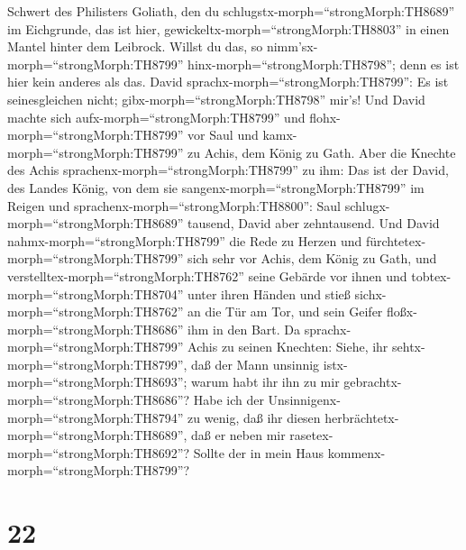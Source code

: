 Schwert des Philisters Goliath, den du
schlugstx-morph=``strongMorph:TH8689'' im Eichgrunde, das ist hier,
gewickeltx-morph=``strongMorph:TH8803'' in einen Mantel hinter dem
Leibrock. Willst du das, so nimm'sx-morph=``strongMorph:TH8799''
hinx-morph=``strongMorph:TH8798''; denn es ist hier kein anderes als
das. David sprachx-morph=``strongMorph:TH8799'': Es ist seinesgleichen
nicht; gibx-morph=``strongMorph:TH8798'' mir's!  Und David
machte sich aufx-morph=``strongMorph:TH8799'' und
flohx-morph=``strongMorph:TH8799'' vor Saul und
kamx-morph=``strongMorph:TH8799'' zu Achis, dem König zu Gath.
 Aber die Knechte des Achis
sprachenx-morph=``strongMorph:TH8799'' zu ihm: Das ist der David, des
Landes König, von dem sie sangenx-morph=``strongMorph:TH8799'' im Reigen
und sprachenx-morph=``strongMorph:TH8800'': Saul
schlugx-morph=``strongMorph:TH8689'' tausend, David aber zehntausend.
 Und David nahmx-morph=``strongMorph:TH8799'' die Rede zu
Herzen und fürchtetex-morph=``strongMorph:TH8799'' sich sehr vor Achis,
dem König zu Gath,  und
verstelltex-morph=``strongMorph:TH8762'' seine Gebärde vor ihnen und
tobtex-morph=``strongMorph:TH8704'' unter ihren Händen und stieß
sichx-morph=``strongMorph:TH8762'' an die Tür am Tor, und sein Geifer
floßx-morph=``strongMorph:TH8686'' ihm in den Bart.  Da
sprachx-morph=``strongMorph:TH8799'' Achis zu seinen Knechten: Siehe,
ihr sehtx-morph=``strongMorph:TH8799'', daß der Mann unsinnig
istx-morph=``strongMorph:TH8693''; warum habt ihr ihn zu mir
gebrachtx-morph=``strongMorph:TH8686''?  Habe ich der
Unsinnigenx-morph=``strongMorph:TH8794'' zu wenig, daß ihr diesen
herbrächtetx-morph=``strongMorph:TH8689'', daß er neben mir
rasetex-morph=``strongMorph:TH8692''? Sollte der in mein Haus
kommenx-morph=``strongMorph:TH8799''?

\hypertarget{section-21}{%
\section{22}\label{section-21}}

